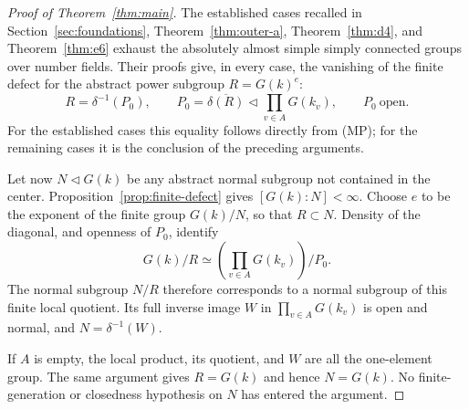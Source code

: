 \begin{proof}[Proof of Theorem~\ref{thm:main}]
The established cases recalled in Section~\ref{sec:foundations},
Theorem~\ref{thm:outer-a}, Theorem~\ref{thm:d4}, and
Theorem~\ref{thm:e6} exhaust the absolutely almost simple simply
connected groups over number fields.  Their proofs give, in every case,
the vanishing of the finite defect for the abstract power subgroup
$R=G(k)^e$:
\[
 R=\delta^{-1}(P_0),\qquad
 P_0=\overline{\delta(R)}\triangleleft\prod_{v\in A}G(k_v),
 \qquad P_0\ \text{open}.
\]
For the established cases this equality follows directly from (MP);
for the remaining cases it is the conclusion of the preceding
arguments.

Let now $N\triangleleft G(k)$ be any abstract normal subgroup not
contained in the center.  Proposition~\ref{prop:finite-defect} gives
$[G(k):N]<\infty$.  Choose $e$ to be the exponent of the finite group
$G(k)/N$, so that $R\subset N$.  Density of the diagonal, and openness
of $P_0$, identify
\[
 G(k)/R\simeq
 \left(\prod_{v\in A}G(k_v)\right)/P_0.
\]
The normal subgroup $N/R$ therefore corresponds to a normal subgroup of
this finite local quotient.  Its full inverse image $W$ in
$\prod_{v\in A}G(k_v)$ is open and normal, and
$N=\delta^{-1}(W)$.

If $A$ is empty, the local product, its quotient, and $W$ are all the
one-element group.  The same argument gives $R=G(k)$ and hence
$N=G(k)$.  No finite-generation or closedness hypothesis on $N$ has
entered the argument.
\end{proof}
